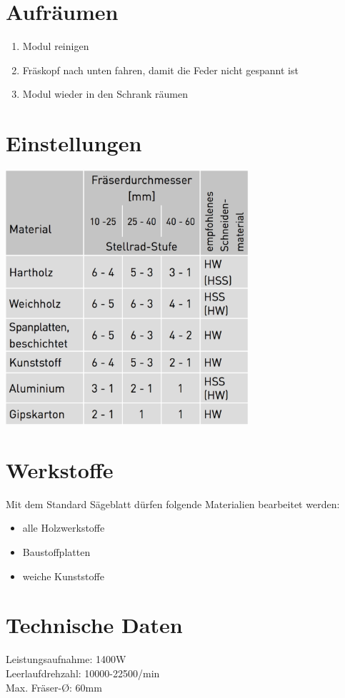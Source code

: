 \documentclass[10pt]{article}
\begin{document}
\section{Aufräumen}
\begin{enumerate}
\item Modul reinigen
\item Fräskopf nach unten fahren, damit die Feder nicht gespannt ist
\item Modul wieder in den Schrank räumen
\end{enumerate}

\section{Einstellungen}
\includegraphics[width=9cm]{images/fraese_drehzahl.png}

\section{Werkstoffe}
Mit dem Standard Sägeblatt dürfen folgende Materialien bearbeitet werden:
\begin{itemize}
\item alle Holzwerkstoffe
\item Baustoffplatten
\item weiche Kunststoffe
\end{itemize}

\section{Technische Daten}
Leistungsaufnahme: 1400W\\
Leerlaufdrehzahl: 10000-22500/min\\
Max. Fräser-Ø: 60mm
\end{document}
